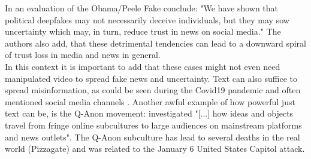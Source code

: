 \documentclass[
  a4paper,  %
  twoside,  %
  bibliography=totoc,
  headsepline,
  cleardoublepage=empty,
  parskip=half,
  draft=false
]{scrbook}
\begin{document}
In an evaluation of the Obama/Peele Fake \citet{vaccariDeepfakesDisinformationExploring2020} conclude: "We have shown that political deepfakes may not necessarily deceive individuals, but they may sow uncertainty which may, in turn, reduce trust in news on social media." The authors also add, that these detrimental tendencies can lead to a downward spiral of trust loss in media and news in general. \\
In this context it is important to add that these cases might not even need manipulated video to spread fake news and uncertainty. Text can also suffice to spread misinformation, as could be seen during the Covid19 pandemic and often mentioned social media channels \cite{naeemExplorationHowFake2021}. Another awful example of how powerful just text can be, is the Q-Anon movement: \cite{zeeuwTracingNormieficationCrossplatform2020} investigated "[...] how ideas and objects travel from fringe online subcultures to large audiences on mainstream platforms and news outlets". The Q-Anon subculture has lead to several deaths in the real world (Pizzagate) and was related to the January 6 United States Capitol attack.
\end{document}
